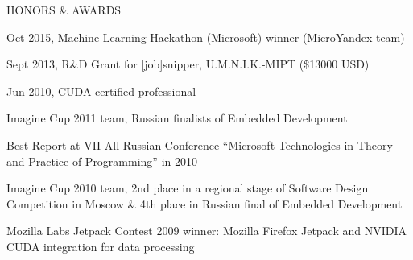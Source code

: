\documentclass{resume} %
\begin{document}

\begin{rSubsectionSchools}{HONORS \& AWARDS}
\item Oct 2015,  Machine Learning Hackathon (Microsoft) winner (MicroYandex team)
\item Sept 2013, R\&D Grant for [job]snipper, U.M.N.I.K.-MIPT (\$13000 USD)
\item Jun 2010, CUDA certified professional
\item Imagine Cup 2011 team, Russian finalists of Embedded Development
\item Best Report at VII All-Russian Conference ``Microsoft Technologies in Theory and Practice of
Programming'' in 2010
\item Imagine Cup 2010 team, 2nd place in a regional stage of Software Design Competition in Moscow
\& 4th place in Russian final of Embedded Development
\item Mozilla Labs Jetpack Contest 2009 winner: Mozilla Firefox Jetpack and NVIDIA CUDA
integration for data processing
\end{rSubsectionSchools}


\pagebreak
\end{document}
